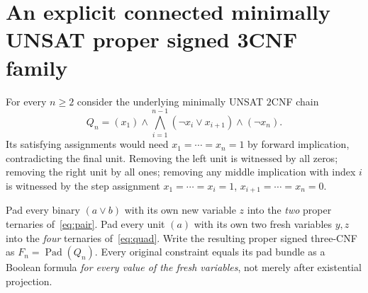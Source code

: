 \documentclass[11pt]{article}
\begin{document}
\section{An explicit connected minimally UNSAT proper signed 3CNF family}
For every $n\ge2$ consider the underlying minimally UNSAT $2$CNF chain
\[
 Q_n=(x_1)\wedge\bigwedge_{i=1}^{n-1}(\neg x_i\vee x_{i+1})\wedge(\neg x_n).\tag{3}
\]
Its satisfying assignments would need $x_1=\cdots=x_n=1$ by forward implication, contradicting the final unit. Removing the left unit is witnessed by all zeros; removing the right unit by all ones; removing any middle implication with index $i$ is witnessed by the step assignment $x_1=\cdots=x_i=1$, $x_{i+1}=\cdots=x_n=0$.

Pad every binary $(a\vee b)$ with its own new variable $z$ into the \emph{two} proper ternaries of~\eqref{eq:pair}. Pad every unit $(a)$ with its own two fresh variables $y,z$ into the \emph{four} ternaries of~\eqref{eq:quad}. Write the resulting proper signed three-CNF as $F_n=\operatorname{Pad}(Q_n)$. Every original constraint equals its pad bundle as a Boolean formula \emph{for every value of the fresh variables}, not merely after existential projection.
\end{document}
